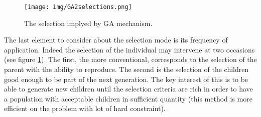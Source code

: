 \begin{figure}[t!]
   \texttt{[image: img/GA2selections.png]}
  \caption{The selection implyed by GA  mechanism.}\label{fig:GA2selections}
  \endminipage\hfill
\end{figure}
The last element to consider about the selection mode is its frequency of application.
Indeed  the selection of the individual may intervene at two occasions (see figure \ref{fig:GA2selections}).  The first, the more conventional, corresponds to the selection of the parent  with the ability to reproduce. The second is the selection of the children good enough to be part of the next generation. The key interest of this is to be able to generate new children until the selection criteria are rich in order to have a population with acceptable children in sufficient quantity (this method is more efficient on the problem with lot of hard constraint). 


 

%
%			 

%
%
	


%


